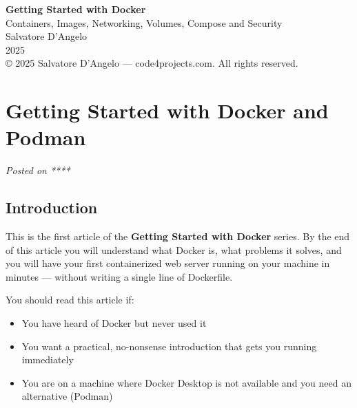 \documentclass[11pt,american,a4paper,openany]{book}
\providecommand{\tightlist}{%
  \setlength{\itemsep}{2pt}\setlength{\parskip}{0pt}}
\begin{document}
\pagestyle{empty}
\vspace*{2cm}
\begin{center}
  {\fontsize{36}{44}\selectfont\bfseries\sffamily Getting Started with
Docker}\\[0.8em]
  {\Large\sffamily\color{gray} Containers, Images, Networking, Volumes,
Compose and Security}\\[3em]
  {\large Salvatore D'Angelo}\\[0.5em]
  {\normalsize\color{gray} 2025}\\[4em]
  {\small\color{gray} © 2025 Salvatore D'Angelo --- code4projects.com.
All rights reserved.}
\end{center}
\newpage

\pagestyle{plain}
{
\hypersetup{linkcolor=NavyBlue}
\setcounter{tocdepth}{2}
\tableofcontents
}
\newpage

\pagestyle{fancy}
\section{Getting Started with Docker and
Podman}\label{getting-started-with-docker-and-podman}

\emph{Posted on ****}

\subsection{Introduction}\label{introduction}

This is the first article of the \textbf{Getting Started with Docker}
series. By the end of this article you will understand what Docker is,
what problems it solves, and you will have your first containerized web
server running on your machine in minutes --- without writing a single
line of Dockerfile.

You should read this article if:

\begin{itemize}
\tightlist
\item
  You have heard of Docker but never used it
\item
  You want a practical, no-nonsense introduction that gets you running
  immediately
\item
  You are on a machine where Docker Desktop is not available and you
  need an alternative (Podman)
\end{itemize}
\end{document}
